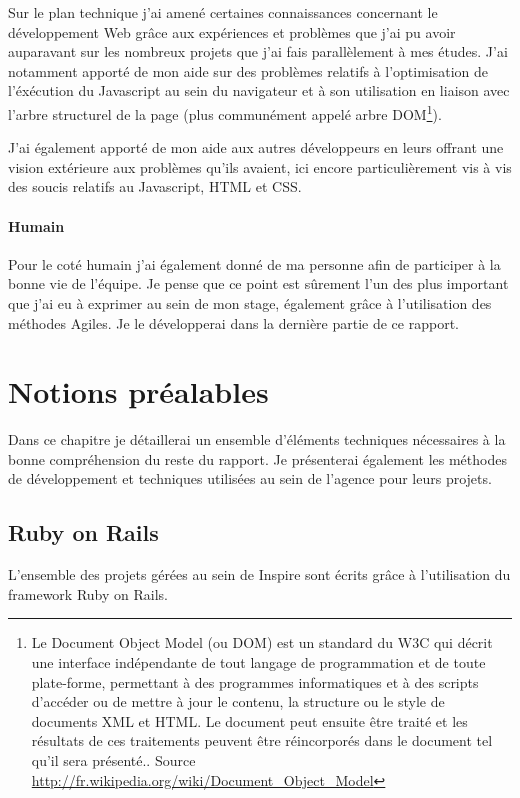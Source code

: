 \documentclass[12pt,a4paper]{book}
\begin{document}
Sur le plan technique j'ai amené certaines connaissances concernant le développement Web grâce aux expériences et problèmes que j'ai pu avoir auparavant sur les nombreux projets que j'ai fais parallèlement à mes études. J'ai notamment apporté de mon aide sur des problèmes relatifs à l'optimisation de l'éxécution du Javascript au sein du navigateur et à son utilisation en liaison avec l'arbre structurel de la page (plus communément appelé arbre DOM\footnote{Le Document Object Model (ou DOM) est un standard du W3C qui décrit une interface indépendante de tout langage de programmation et de toute plate-forme, permettant à des programmes informatiques et à des scripts d'accéder ou de mettre à jour le contenu, la structure ou le style de documents XML et HTML. Le document peut ensuite être traité et les résultats de ces traitements peuvent être réincorporés dans le document tel qu'il sera présenté.. Source \url{http://fr.wikipedia.org/wiki/Document_Object_Model}}).

J'ai également apporté de mon aide aux autres développeurs en leurs offrant une vision extérieure aux problèmes qu'ils avaient, ici encore particulièrement vis à vis des soucis relatifs au Javascript, HTML et CSS. 

\subsubsection{Humain}

Pour le coté humain j'ai également donné de ma personne afin de participer à la bonne vie de l'équipe. Je pense que ce point est sûrement l'un des plus important que j'ai eu à exprimer au sein de mon stage, également grâce à l'utilisation des méthodes Agiles. Je le développerai dans la dernière partie de ce rapport.

\chapter{Notions préalables}

Dans ce chapitre je détaillerai un ensemble d'éléments techniques nécessaires à la bonne compréhension du reste du rapport. Je présenterai également les méthodes de développement et techniques utilisées au sein de l'agence pour leurs projets.

\section{Ruby on Rails}

L'ensemble des projets gérées au sein de Inspire sont écrits grâce à l'utilisation du framework Ruby on Rails.
\end{document}
